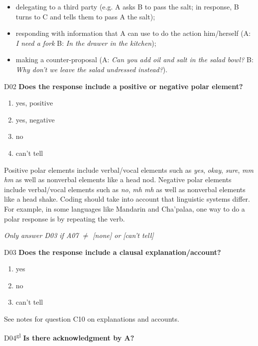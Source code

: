 \documentclass[output=paper]{langsci/langscibook}
\begin{document}
\begin{description}
\begin{itemize}
\item delegating to a third party (e.g. A asks B to pass the salt; in response, B turns to C and tells them to pass A the salt);
\item responding with information that A can use to do the action him/herself (A: \textit{I need a fork} B: \textit{In the drawer in the kitchen});
\item making a counter-proposal (A: \textit{Can you add oil and salt in the salad bowl?} B: \textit{Why don’t we leave the salad undressed instead?}).
\end{itemize}

\item
D02  \textbf{Does the response include a positive or negative polar element?}

\begin{enumerate}
\item {yes, positive}
\item {yes, negative}
\item {no}
\item {can’t tell}
\end{enumerate}

Positive polar elements include verbal/vocal elements such as \textit{yes}, \textit{okay}, \textit{sure}, \textit{mm hm} as well as nonverbal elements like a head nod. Negative polar elements include verbal/vocal elements such as \textit{no}, \textit{mh mh} as well as nonverbal elements like a head shake. Coding should take into account that linguistic systems differ. For example, in some languages like Mandarin and Cha’palaa, one way to do a polar response is by repeating the verb.

\smallskip

\item
\textit{Only answer D03 if A07 ${\neq}$ [none] or [can’t tell]}

\item
D03 \textbf{Does the response include a clausal explanation/account?}

\begin{enumerate}
\item {yes}
\item {no}
\item {can’t tell}
\end{enumerate}

See notes for question C10 on explanations and accounts.

\item
D04\textsuperscript{gl}  \textbf{Is there acknowledgment by A?}


\end{description}
\end{document}
